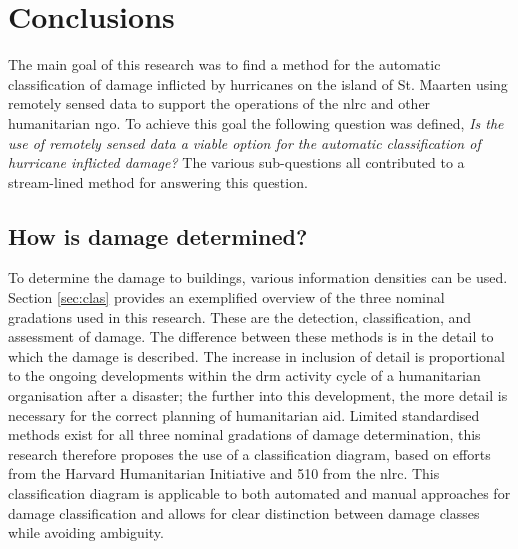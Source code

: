 \chapter{Conclusions} \label{concl}
The main goal of this research was to find a method for the automatic classification of damage inflicted by hurricanes on the island of St. Maarten using remotely sensed data to support the operations of the \ac{nlrc} and other humanitarian \ac{ngo}. To achieve this goal the following question was defined, \textit{Is the use of remotely sensed data a viable option for the automatic classification of hurricane inflicted damage?} The various sub-questions all contributed to a stream-lined method for answering this question. 

\section{How is damage determined?}
To determine the damage to buildings, various information densities can be used. Section \ref{sec:clas} provides an exemplified overview of the three nominal gradations used in this research. These are the detection, classification, and assessment of damage. The difference between these methods is in the detail to which the damage is described. The increase in inclusion of detail is proportional to the ongoing developments within the \ac{drm} activity cycle of a humanitarian organisation after a disaster; the further into this development, the more detail is necessary for the correct planning of humanitarian aid. Limited standardised methods exist for all three nominal gradations of damage determination, this research therefore proposes the use of a classification diagram, based on efforts from the Harvard Humanitarian Initiative and 510 from the \ac{nlrc}. This classification diagram is applicable to both automated and manual approaches for damage classification and allows for clear distinction between damage classes while avoiding ambiguity.

